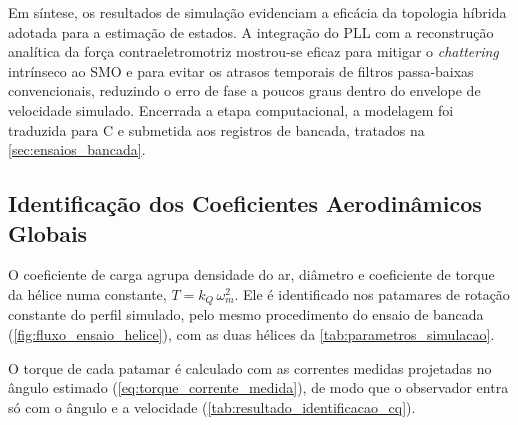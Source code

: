 Em síntese, os resultados de simulação evidenciam a eficácia da topologia
híbrida adotada para a estimação de estados. A integração do PLL com a
reconstrução analítica da força contraeletromotriz mostrou-se eficaz para
mitigar o \textit{chattering} intrínseco ao SMO e para evitar os atrasos
temporais de filtros passa-baixas convencionais, reduzindo o erro de fase a
poucos graus dentro do envelope de velocidade simulado. Encerrada a etapa
computacional, a modelagem foi traduzida para C e submetida aos registros de
bancada, tratados na \autoref{sec:ensaios_bancada}.

\newpage

\subsection{Identificação dos Coeficientes Aerodinâmicos Globais}
\label{sec:coef_aero}

O coeficiente de carga agrupa densidade do ar, diâmetro e coeficiente de
torque da hélice numa constante, $T = k_Q\,\omega_m^2$. Ele é identificado nos
patamares de rotação constante do perfil simulado, pelo mesmo procedimento do
ensaio de bancada (\autoref{fig:fluxo_ensaio_helice}), com as duas hélices
da \autoref{tab:parametros_simulacao}.

O torque de cada patamar é calculado com as correntes medidas projetadas no
ângulo estimado (\autoref{eq:torque_corrente_medida}), de modo que o
observador entra só com o ângulo e a velocidade
(\autoref{tab:resultado_identificacao_cq}).

